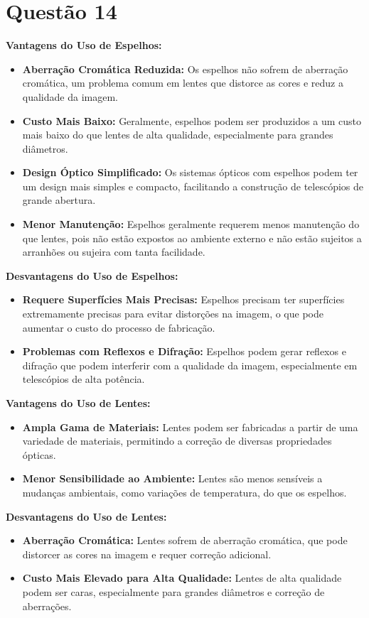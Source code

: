 \documentclass[a4paper, 12pt]{article}
\begin{document}
\section*{Questão 14}
\textbf{Vantagens do Uso de Espelhos:}
\begin{itemize}
    \item \textbf{Aberração Cromática Reduzida:} Os espelhos não sofrem de aberração cromática, um problema comum em lentes que distorce as cores e reduz a qualidade da imagem.
    \item \textbf{Custo Mais Baixo:} Geralmente, espelhos podem ser produzidos a um custo mais baixo do que lentes de alta qualidade, especialmente para grandes diâmetros.
    \item \textbf{Design Óptico Simplificado:} Os sistemas ópticos com espelhos podem ter um design mais simples e compacto, facilitando a construção de telescópios de grande abertura.
    \item \textbf{Menor Manutenção:} Espelhos geralmente requerem menos manutenção do que lentes, pois não estão expostos ao ambiente externo e não estão sujeitos a arranhões ou sujeira com tanta facilidade.
\end{itemize}

\textbf{Desvantagens do Uso de Espelhos:}
\begin{itemize}
    \item \textbf{Requere Superfícies Mais Precisas:} Espelhos precisam ter superfícies extremamente precisas para evitar distorções na imagem, o que pode aumentar o custo do processo de fabricação.
    \item \textbf{Problemas com Reflexos e Difração:} Espelhos podem gerar reflexos e difração que podem interferir com a qualidade da imagem, especialmente em telescópios de alta potência.
\end{itemize}

\textbf{Vantagens do Uso de Lentes:}
\begin{itemize}
    \item \textbf{Ampla Gama de Materiais:} Lentes podem ser fabricadas a partir de uma variedade de materiais, permitindo a correção de diversas propriedades ópticas.
    \item \textbf{Menor Sensibilidade ao Ambiente:} Lentes são menos sensíveis a mudanças ambientais, como variações de temperatura, do que os espelhos.
\end{itemize}

\textbf{Desvantagens do Uso de Lentes:}
\begin{itemize}
    \item \textbf{Aberração Cromática:} Lentes sofrem de aberração cromática, que pode distorcer as cores na imagem e requer correção adicional.
    \item \textbf{Custo Mais Elevado para Alta Qualidade:} Lentes de alta qualidade podem ser caras, especialmente para grandes diâmetros e correção de aberrações.
\end{itemize}
\end{document}
